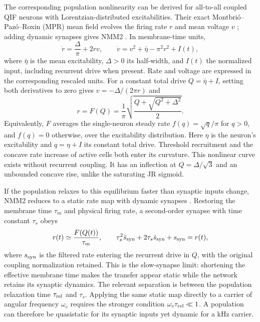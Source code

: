 \documentclass[11pt,a4paper]{article}
\begin{document}
The corresponding population nonlinearity can be derived for all-to-all coupled
QIF neurons with Lorentzian-distributed excitabilities. Their exact
Montbri\'o--Paz\'o--Roxin (MPR) mean field evolves the firing rate $r$ and mean voltage
$v$ \cite{montbrio2015}; adding dynamic synapses gives NMM2
\cite{ruffini2021nmm2,clusella2023}. In membrane-time units,
\begin{equation}
\dot r=\frac{\Delta}{\pi}+2rv,\qquad
\dot v=v^2+\bar\eta-\pi^2r^2+I(t),
\label{eq:mpr}
\end{equation}
where $\bar\eta$ is the mean excitability, $\Delta>0$ its half-width, and $I(t)$ the
normalized input, including recurrent drive when present. Rate and voltage are
expressed in the corresponding rescaled units. For a constant total drive
$Q=\bar\eta+I$, setting both derivatives to zero gives $v=-\Delta/(2\pi r)$ and
\begin{equation}
r=F(Q)=\frac{1}{\pi}\sqrt{\frac{Q+\sqrt{Q^2+\Delta^2}}{2}} .
\label{eq:Fmpr}
\end{equation}
Equivalently, $F$ averages the single-neuron steady rate $f(q)=\sqrt q/\pi$ for
$q>0$, and $f(q)=0$ otherwise, over the excitability distribution. Here $\eta$ is
the neuron's excitability and $q=\eta+I$ its constant total drive. Threshold
recruitment and the concave rate increase of active cells both enter its curvature. This nonlinear curve exists
without recurrent coupling. It has an inflection at
$Q=\Delta/\sqrt3$ and an unbounded concave rise, unlike the saturating JR sigmoid.

If the population relaxes to this equilibrium faster than synaptic inputs change,
NMM2 reduces to a static rate map with dynamic synapses
\cite{ruffini2021nmm2,clusella2023}. Restoring the membrane time $\tau_m$ and physical
firing rate, a second-order synapse with time constant $\tau_s$ obeys
\begin{equation}
r(t)\simeq \frac{F(Q(t))}{\tau_m},\qquad
\tau_s^2\ddot s_{\rm syn}+2\tau_s\dot s_{\rm syn}+s_{\rm syn}=r(t),
\label{eq:slow_synapse}
\end{equation}
where $s_{\rm syn}$ is the filtered rate entering the recurrent drive in $Q$, with the original
coupling normalization retained. This is the slow-synapse limit: shortening the
effective membrane time makes the transfer appear static while the network retains
its synaptic dynamics. The relevant separation is between the population relaxation
time $\tau_{\rm rel}$ and $\tau_s$. Applying the same static map directly to a
carrier of angular frequency $\omega_c$ requires the stronger condition
$\omega_c\tau_{\rm rel}\ll1$. A population can therefore be quasistatic for its
synaptic inputs yet dynamic for a kHz carrier.
\end{document}
